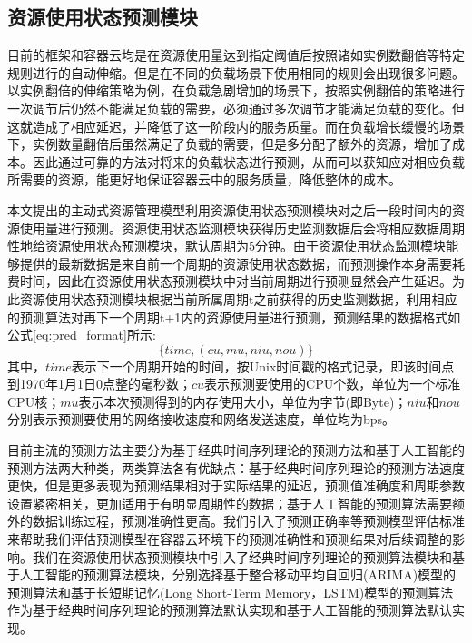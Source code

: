 \subsection{资源使用状态预测模块}\label{sec:prediction}
目前的框架和容器云均是在资源使用量达到指定阈值后按照诸如实例数翻倍等特定规则进行的自动伸缩。但是在不同的负载场景下使用相同的规则会出现很多问题。以实例翻倍的伸缩策略为例，在负载急剧增加的场景下，按照实例翻倍的策略进行一次调节后仍然不能满足负载的需要，必须通过多次调节才能满足负载的变化。但这就造成了相应延迟，并降低了这一阶段内的服务质量。而在负载增长缓慢的场景下，实例数量翻倍后虽然满足了负载的需要，但是多分配了额外的资源，增加了成本。因此通过可靠的方法对将来的负载状态进行预测，从而可以获知应对相应负载所需要的资源，能更好地保证容器云中的服务质量，降低整体的成本。

本文提出的主动式资源管理模型利用资源使用状态预测模块对之后一段时间内的资源使用量进行预测。资源使用状态监测模块获得历史监测数据后会将相应数据周期性地给资源使用状态预测模块，默认周期为5分钟。由于资源使用状态监测模块能够提供的最新数据是来自前一个周期的资源使用状态数据，而预测操作本身需要耗费时间，因此在资源使用状态预测模块中对当前周期进行预测显然会产生延迟。为此资源使用状态预测模块根据当前所属周期t之前获得的历史监测数据，利用相应的预测算法对再下一个周期t+1内的资源使用量进行预测，预测结果的数据格式如公式\ref{eq:pred_format}所示:
\begin{equation}\label{eq:pred_format}
\{time, (cu, mu, niu, nou)\}
\end{equation}
其中，$time$表示下一个周期开始的时间，按Unix时间戳的格式记录，即该时间点到1970年1月1日0点整的毫秒数；$cu$表示预测要使用的CPU个数，单位为一个标准CPU核；$mu$表示本次预测得到的内存使用大小，单位为字节(即Byte)；$niu$和$nou$分别表示预测要使用的网络接收速度和网络发送速度，单位均为bps。

目前主流的预测方法主要分为基于经典时间序列理论的预测方法和基于人工智能的预测方法两大种类，两类算法各有优缺点：基于经典时间序列理论的预测方法速度更快，但是更多表现为预测结果相对于实际结果的延迟，预测值准确度和周期参数设置紧密相关，更加适用于有明显周期性的数据；基于人工智能的预测算法需要额外的数据训练过程，预测准确性更高。我们引入了预测正确率等预测模型评估标准来帮助我们评估预测模型在容器云环境下的预测准确性和预测结果对后续调整的影响。我们在资源使用状态预测模块中引入了经典时间序列理论的预测算法模块和基于人工智能的预测算法模块，分别选择基于整合移动平均自回归(ARIMA)模型的预测算法和基于长短期记忆(Long Short-Term Memory，LSTM)模型\cite{hochreiter1997long}的预测算法作为基于经典时间序列理论的预测算法默认实现和基于人工智能的预测算法默认实现。

